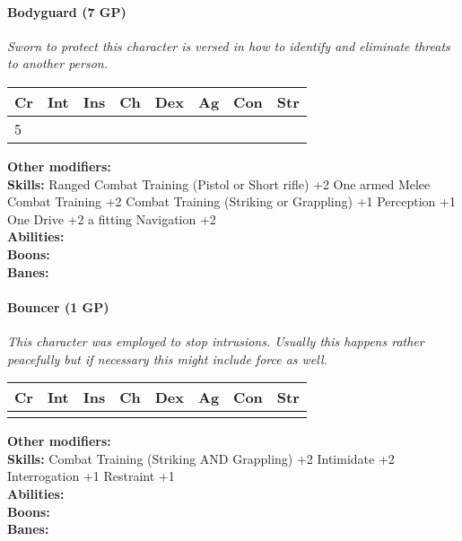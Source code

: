 \documentclass[12pt,a4paper,openany]{book}
\begin{document}
	\hrulefill
	\paragraph*{Bodyguard (7 GP)}
	\textit{Sworn to protect this character is versed in how to identify and eliminate threats to another person.}\par
	\begin{tabular}{|l|l|l|l|l|l|l|l|}
		\hline
		Cr & Int & Ins & Ch & Dex & Ag & Con & Str \\ \hline
		5 &  &  &  &  &  &  &  \\ \hline
	\end{tabular}\par
	\noindent\textbf{Other modifiers:} \\
	\textbf{Skills:} Ranged Combat Training (Pistol or Short rifle) +2
	One armed Melee Combat Training +2
	Combat Training (Striking or Grappling) +1
	Perception +1
	One Drive +2
	a fitting Navigation +2\\
	\textbf{Abilities:} \\
	\textbf{Boons:} \\
	\textbf{Banes:} \\
	
	\hrulefill
	\paragraph*{Bouncer (1 GP)}
	\textit{This character was employed to stop intrusions. Usually this happens rather peacefully but if necessary this might include force as well.}\par
	\begin{tabular}{|l|l|l|l|l|l|l|l|}
		\hline
		Cr & Int & Ins & Ch & Dex & Ag & Con & Str \\ \hline
		&  &  &  &  &  &  &  \\ \hline
	\end{tabular}\par
	\noindent\textbf{Other modifiers:} \\
	\textbf{Skills:} Combat Training (Striking AND Grappling) +2
	Intimidate +2
	Interrogation +1
	Restraint +1\\
	\textbf{Abilities:} \\
	\textbf{Boons:} \\
	\textbf{Banes:} \\
	
	\hrulefill
\end{document}
